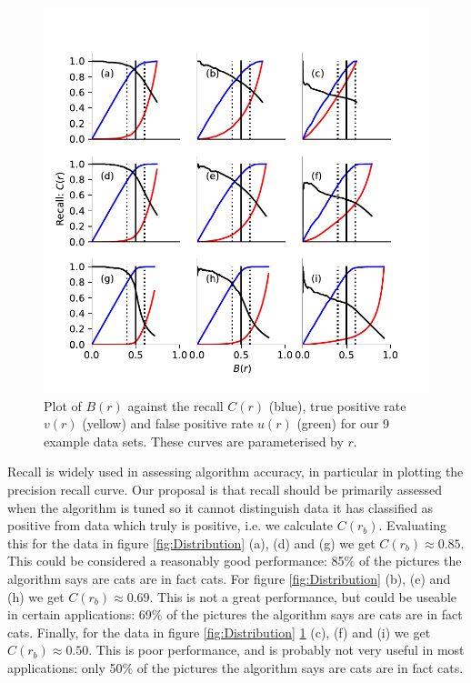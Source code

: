 \documentclass{article}
\begin{document}
\begin{figure}[t]
\centering
\includegraphics[scale=1]{Balance.pdf}
\caption{Plot of $B(r)$ against the recall $C(r)$ (blue), true positive rate $v(r)$ (yellow) and false positive rate $u(r)$ (green) for our 9 example data sets. These curves are parameterised by $r$. }
\label{fig:balance}
\end{figure}

Recall is widely used in assessing algorithm accuracy, in particular in plotting the precision recall curve. Our proposal is that recall should be primarily assessed when the algorithm is tuned so it cannot distinguish data it has classified as positive from data which truly is positive, i.e. we calculate $C(r_b)$. Evaluating this for the data in figure \ref{fig:Distribution} (a), (d) and (g) we get $C(r_b) \approx  0.85$. This could be considered a reasonably good performance: 85\% of the pictures the algorithm says are cats are in fact cats. For figure \ref{fig:Distribution}  (b), (e) and (h) we get $C(r_b) \approx 0.69$. This is not a great performance, but could be useable in certain applications: 69\% of the pictures the algorithm says are cats are in fact cats. Finally, for the data in figure \ref{fig:Distribution} \ref{fig:balance} (c), (f) and (i) we get $C(r_b) \approx  0.50$. This is poor performance, and is probably not very useful in most applications: only 50\% of the pictures the algorithm says are cats are in fact cats. 
\end{document}
